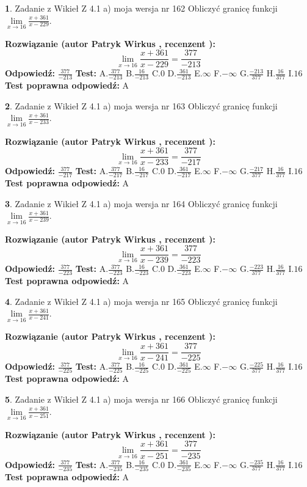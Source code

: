 \documentclass[12pt, a4paper]{article}
\theoremstyle{definition} %
\newtheorem{zad}{}
\newcommand{\zadStart}[1]{\begin{zad}#1\newline}
\newcommand{\zadStop}{\end{zad}}
\newcommand{\rozwStart}[2]{\noindent \textbf{Rozwiązanie (autor #1 , recenzent #2): }\newline}
\newcommand{\rozwStop}{\newline}
\newcommand{\odpStart}{\noindent \textbf{Odpowiedź:}\newline}
\newcommand{\odpStop}{\newline}
\newcommand{\testStart}{\noindent \textbf{Test:}\newline}
\newcommand{\testStop}{\newline}
\newcommand{\kluczStart}{\noindent \textbf{Test poprawna odpowiedź:}\newline}
\newcommand{\kluczStop}{\newline}
\begin{document}
\zadStart{Zadanie z Wikieł Z 4.1 a) moja wersja nr 162}
Obliczyć granicę funkcji $\lim\limits_{x\to16}\frac{x+361}{x-229}$.
\zadStop
\rozwStart{Patryk Wirkus}{}
$$\lim\limits_{x\to16}\frac{x+361}{x-229} = \frac{377}{-213}$$
\rozwStop
\odpStart
$\frac{377}{-213}$
\odpStop
\testStart
A.$\frac{377}{-213}$
B.$\frac{16}{-213}$
C.$0$
D.$\frac{361}{-213}$
E.$\infty$
F.$-\infty$
G.$\frac{-213}{377}$
H.$\frac{16}{377}$
I.$16$
\testStop
\kluczStart
A
\kluczStop



\zadStart{Zadanie z Wikieł Z 4.1 a) moja wersja nr 163}
Obliczyć granicę funkcji $\lim\limits_{x\to16}\frac{x+361}{x-233}$.
\zadStop
\rozwStart{Patryk Wirkus}{}
$$\lim\limits_{x\to16}\frac{x+361}{x-233} = \frac{377}{-217}$$
\rozwStop
\odpStart
$\frac{377}{-217}$
\odpStop
\testStart
A.$\frac{377}{-217}$
B.$\frac{16}{-217}$
C.$0$
D.$\frac{361}{-217}$
E.$\infty$
F.$-\infty$
G.$\frac{-217}{377}$
H.$\frac{16}{377}$
I.$16$
\testStop
\kluczStart
A
\kluczStop



\zadStart{Zadanie z Wikieł Z 4.1 a) moja wersja nr 164}
Obliczyć granicę funkcji $\lim\limits_{x\to16}\frac{x+361}{x-239}$.
\zadStop
\rozwStart{Patryk Wirkus}{}
$$\lim\limits_{x\to16}\frac{x+361}{x-239} = \frac{377}{-223}$$
\rozwStop
\odpStart
$\frac{377}{-223}$
\odpStop
\testStart
A.$\frac{377}{-223}$
B.$\frac{16}{-223}$
C.$0$
D.$\frac{361}{-223}$
E.$\infty$
F.$-\infty$
G.$\frac{-223}{377}$
H.$\frac{16}{377}$
I.$16$
\testStop
\kluczStart
A
\kluczStop



\zadStart{Zadanie z Wikieł Z 4.1 a) moja wersja nr 165}
Obliczyć granicę funkcji $\lim\limits_{x\to16}\frac{x+361}{x-241}$.
\zadStop
\rozwStart{Patryk Wirkus}{}
$$\lim\limits_{x\to16}\frac{x+361}{x-241} = \frac{377}{-225}$$
\rozwStop
\odpStart
$\frac{377}{-225}$
\odpStop
\testStart
A.$\frac{377}{-225}$
B.$\frac{16}{-225}$
C.$0$
D.$\frac{361}{-225}$
E.$\infty$
F.$-\infty$
G.$\frac{-225}{377}$
H.$\frac{16}{377}$
I.$16$
\testStop
\kluczStart
A
\kluczStop



\zadStart{Zadanie z Wikieł Z 4.1 a) moja wersja nr 166}
Obliczyć granicę funkcji $\lim\limits_{x\to16}\frac{x+361}{x-251}$.
\zadStop
\rozwStart{Patryk Wirkus}{}
$$\lim\limits_{x\to16}\frac{x+361}{x-251} = \frac{377}{-235}$$
\rozwStop
\odpStart
$\frac{377}{-235}$
\odpStop
\testStart
A.$\frac{377}{-235}$
B.$\frac{16}{-235}$
C.$0$
D.$\frac{361}{-235}$
E.$\infty$
F.$-\infty$
G.$\frac{-235}{377}$
H.$\frac{16}{377}$
I.$16$
\testStop
\kluczStart
A
\kluczStop
\end{document}
